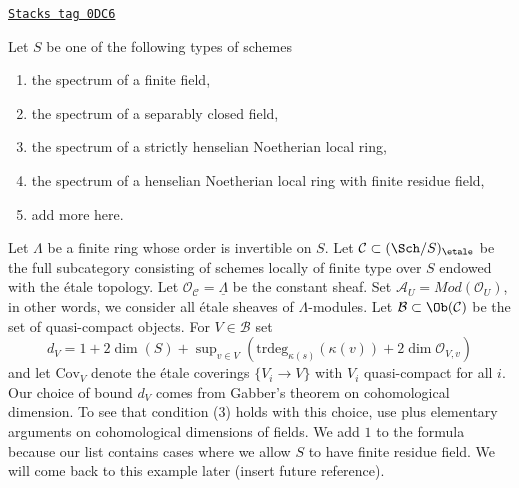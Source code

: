 \begin{example}[Etale]
\label{spaces-simplicial-example-etale}
\href{https://stacks.math.columbia.edu/tag/0DC6}{\texttt{Stacks tag 0DC6}}

Let $S$ be one of the following types of schemes
\begin{enumerate}
\item the spectrum of a finite field,
\item the spectrum of a separably closed field,
\item the spectrum of a strictly henselian Noetherian local ring,
\item the spectrum of a henselian Noetherian local ring with
finite residue field,
\item add more here.
\end{enumerate}
Let $\Lambda$ be a finite ring whose order is invertible on $S$.
Let $\mathcal{C} \subset (\Sch/S)_\etale$
be the full subcategory consisting of schemes locally of finite
type over $S$ endowed with the \'etale topology.
Let $\mathcal{O}_\mathcal{C} = \underline{\Lambda}$ be the
constant sheaf. Set $\mathcal{A}_U = \textit{Mod}(\mathcal{O}_U)$,
in other words, we consider all \'etale sheaves of $\Lambda$-modules.
Let $\mathcal{B} \subset \Ob(\mathcal{C})$
be the set of quasi-compact objects. For $V \in \mathcal{B}$ set
$$
d_V = 1 + 2\dim(S) +
\sup\nolimits_{v \in V}(\text{trdeg}_{\kappa(s)}(\kappa(v)) +
2 \dim \mathcal{O}_{V, v})
$$
and let $\text{Cov}_V$ denote the \'etale coverings $\{V_i \to V\}$
with $V_i$ quasi-compact for all $i$.
Our choice of bound $d_V$ comes from Gabber's theorem
on cohomological dimension. To see that condition (3)
holds with this choice, use
\cite[Expos\'e VIII-A, Corollary 1.2 and Lemma 2.2]{Traveaux}
plus elementary arguments on cohomological dimensions of fields.
We add $1$ to the formula because our list contains cases where we allow $S$
to have finite residue field.
We will come back to this example later (insert future reference).
\end{example}

